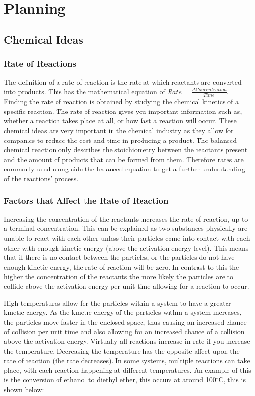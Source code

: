 \chapter {Planning}

\section {Chemical Ideas}


	\subsection{Rate of Reactions}

The definition of a rate of reaction is the rate at which reactants are converted into products. This has the mathematical equation of $Rate = \frac{\Delta Concentration}{Time}$. Finding the rate of reaction is obtained by studying the chemical kinetics of a specific reaction. The rate of reaction gives you important information such as, whether a reaction takes place at all, or how fast a reaction will occur. These chemical ideas are very important in the chemical industry as they allow for companies to reduce the cost and time in producing a product. The balanced chemical reaction only describes the stoichiometry between the reactants present and the amount of products that can be formed from them. Therefore rates are commonly used along side the balanced equation to get a further understanding of the reactions' process.

	\subsection{Factors that Affect the Rate of Reaction}

Increasing the concentration of the reactants increases the rate of reaction, up to a terminal concentration. This can be explained as two substances physically are unable to react with each other unless their particles come into contact with each other with enough kinetic energy (above the activation energy level). This means that if there is no contact between the particles, or the particles do not have enough kinetic energy, the rate of reaction will be zero. In contrast to this the higher the concentration of the reactants the more likely the particles are to collide above the activation energy per unit time allowing for a reaction to occur.

High temperatures allow for the particles within a system to have a greater kinetic energy. As the kinetic energy of the particles within a system increases, the particles move faster in the enclosed space, thus causing an increased chance of collision per unit time and also allowing for an increased chance of a collision above the activation energy. Virtually all reactions increase in rate if you increase the temperature. Decreasing the temperature has the opposite affect upon the rate of reaction (the rate decreases). In some systems, multiple reactions can take place, with each reaction happening at different temperatures. An example of this is the conversion of ethanol to diethyl ether, this occurs at around 100$^{\circ}$C, this is shown below:

